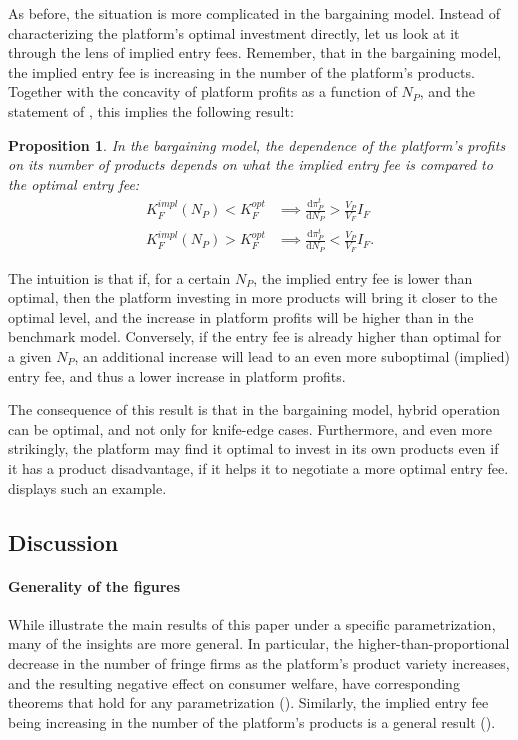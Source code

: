 \documentclass[a4paper]{article}
\newtheorem{proposition}{Proposition}
\newcommand{\dd}{\mathrm{d}}
\begin{document}
As before, the situation is more complicated in the bargaining model.
Instead of characterizing the platform's optimal investment directly, let us look at it through the lens of implied entry fees.
Remember, that in the bargaining model, the implied entry fee is increasing in the number of the platform's products.
Together with the concavity of platform profits as a function of $N_P$, and the statement of , this implies the following result:
\begin{proposition}
    \label{prop:comparative_n_p_bargaining}
    In the bargaining model, the dependence of the platform's profits on its number of products depends on what the implied entry fee is compared to the optimal entry fee:
    \begin{align*}
        K_F^{impl}(N_P) < K_F^{opt} &\implies \frac{\dd \pi_P^t}{\dd N_P} > \frac{V_P}{V_F} I_F \\
        K_F^{impl}(N_P) > K_F^{opt} &\implies \frac{\dd \pi_P^t}{\dd N_P} < \frac{V_P}{V_F} I_F.
    \end{align*}
\end{proposition}
The intuition is that if, for a certain $N_P$, the implied entry fee is lower than optimal, then the platform investing in more products will bring it closer to the optimal level, and the increase in platform profits will be higher than in the benchmark model.
Conversely, if the entry fee is already higher than optimal for a given $N_P$, an additional increase will lead to an even more suboptimal (implied) entry fee, and thus a lower increase in platform profits.

The consequence of this result is that in the bargaining model, hybrid operation can be optimal, and not only for knife-edge cases.
Furthermore, and even more strikingly, the platform may find it optimal to invest in its own products even if it has a product disadvantage, if it helps it to negotiate a more optimal entry fee.
 displays such an example.

\subsection{Discussion}
\label{sec:results_discussion}

\paragraph{Generality of the figures}
While  illustrate the main results of this paper under a specific parametrization, many of the insights are more general.
In particular, the higher-than-proportional decrease in the number of fringe firms as the platform's product variety increases, and the resulting negative effect on consumer welfare, have corresponding theorems that hold for any parametrization ().
Similarly, the implied entry fee being increasing in the number of the platform's products is a general result ().
\end{document}
